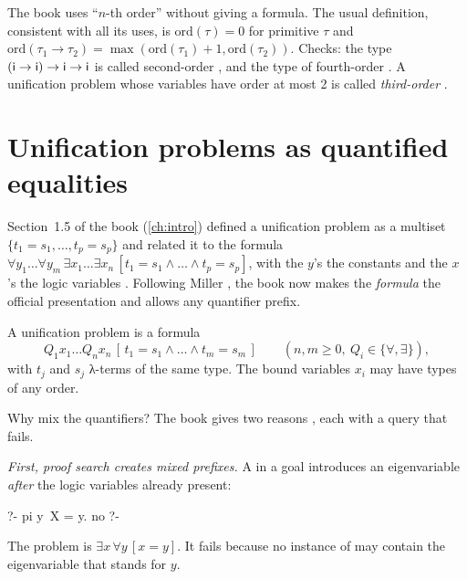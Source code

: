 {\begin{remark}
The book uses \enquote{$n$-th order} without giving a formula. The usual definition, consistent with all
its uses, is $\mathrm{ord}(\tau)=0$ for primitive $\tau$ and
$\mathrm{ord}(\tau_1\to\tau_2)=\max(\mathrm{ord}(\tau_1)+1,\mathrm{ord}(\tau_2))$. Checks: the type
$(\mathsf{i}\to\mathsf{i})\to\mathsf{i}\to\mathsf{i}$ is called second-order , and the type of
 fourth-order . A unification problem whose variables have order at most
2 is called \emph{third-order} .
\end{remark}

\section{Unification problems as quantified equalities}\label{sec:lambda-unifprob}

Section~1.5 of the book (\cref{ch:intro}) defined a unification problem as a multiset $\{t_1=s_1,\dots,t_p=s_p\}$ and related it
to the formula $\forall y_1\dots\forall y_m\,\exists x_1\dots\exists x_n\,[t_1=s_1\wedge\dots\wedge
t_p=s_p]$, with the $y$'s the constants and the $x$'s the logic variables . Following Miller
\cite{Miller1991,Miller1992}, the book now makes the \emph{formula} the official presentation and
allows any quantifier prefix.

\begin{definition}\label{def:lambda-unifprob}
A unification problem is a formula
\[
  Q_1x_1\dots Q_nx_n\,[\,t_1=s_1\wedge\dots\wedge t_m=s_m\,]\qquad(n,m\ge 0,\ Q_i\in\{\forall,\exists\}),
\]
with $t_j$ and $s_j$ λ-terms of the same type. The bound variables $x_i$ may have types of any order.
\end{definition}

Why mix the quantifiers? The book gives two reasons , each with a query that fails.

\emph{First, \fohh{} proof search creates mixed prefixes.} A  in a goal introduces an
eigenvariable \emph{after} the logic variables already present:
\begin{lprolog}
?- pi y\ X = y.
no
?-
\end{lprolog}
The problem is $\exists x\,\forall y\,[x=y]$. It fails because no instance of  may contain the
eigenvariable that stands for $y$.

}
